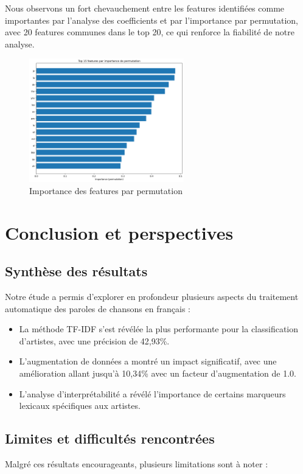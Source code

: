 \documentclass[a4paper,11pt]{article}
\begin{document}
Nous observons un fort chevauchement entre les features identifiées comme importantes par l'analyse des coefficients et par l'importance par permutation, avec 20 features communes dans le top 20, ce qui renforce la fiabilité de notre analyse.

\begin{figure}[ht]
    \centering
    \includegraphics[width=0.6\textwidth]{results_rapport/permutation_importance.png}
    \caption{Importance des features par permutation}
    \label{fig:permutation-importance}
\end{figure}

\section{Conclusion et perspectives}
\label{sec:conclusion}

\subsection{Synthèse des résultats}
Notre étude a permis d'explorer en profondeur plusieurs aspects du traitement automatique des paroles de chansons en français :

\begin{itemize}
    \item La méthode TF-IDF s'est révélée la plus performante pour la classification d'artistes, avec une précision de 42,93\%.
    \item L'augmentation de données a montré un impact significatif, avec une amélioration allant jusqu'à 10,34\% avec un facteur d'augmentation de 1.0.
    \item L'analyse d'interprétabilité a révélé l'importance de certains marqueurs lexicaux spécifiques aux artistes.
\end{itemize}

\subsection{Limites et difficultés rencontrées}
Malgré ces résultats encourageants, plusieurs limitations sont à noter :
\end{document}
